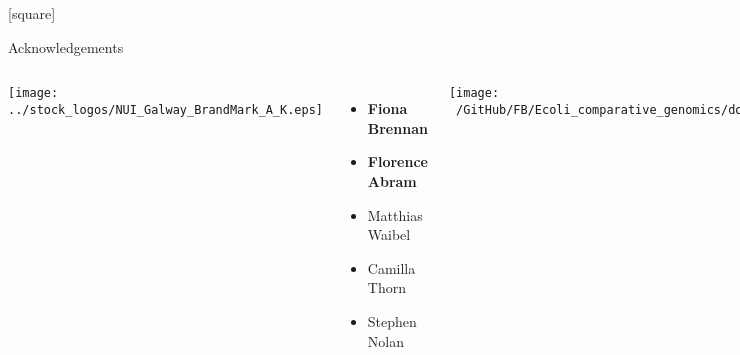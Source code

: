 \documentclass[10pt, compress]{beamer}
\begin{document}
[square]
\begin{frame}{Acknowledgements}
  \begin{columns}[onlytextwidth]
    \texttt{[image: ../stock\_logos/NUI\_Galway\_BrandMark\_A\_K.eps]}\\
      \begin{itemize}
        \item \textbf{Fiona Brennan}
        \item \textbf{Florence Abram}
        \item Matthias Waibel
        \item Camilla Thorn
        \item Stephen Nolan
        \end{itemize}
        \vfill

    \texttt{[image: ~/GitHub/FB/Ecoli\_comparative\_genomics/doc/presentations/MyNUIG(mnuigtheme)/frequentFigs/jhi\_dark.png]}\\
      \begin{itemize}
      \item \textbf{Leighton Pritchard}
        \item \textbf{Ashleigh Holmnes}
        \end{itemize}
        \vskip 1.2cm
        \alert<2>{}
  \end{columns}
\end{frame}



\end{document}
